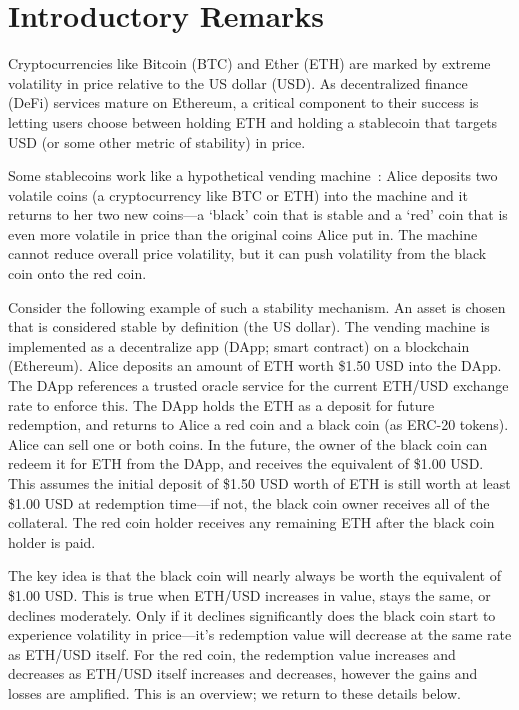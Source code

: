 

\section{Introductory Remarks}

Cryptocurrencies like Bitcoin (BTC) and Ether (ETH) are marked by extreme volatility in price relative to the US dollar (USD). As decentralized finance (DeFi) services mature on Ethereum, a critical component to their success is letting users choose between holding ETH and holding a stablecoin that targets USD (or some other metric of stability) in price.

Some stablecoins work like a hypothetical vending machine~\cite{CDM20}: Alice deposits two volatile coins (\eg a cryptocurrency like BTC or ETH) into the machine and it returns to her two new coins---a `black' coin that is stable and a `red' coin that is even more volatile in price than the original coins Alice put in. The machine cannot reduce overall price volatility, but it can push volatility from the black coin onto the red coin. 

Consider the following example of such a stability mechanism. An asset is chosen that is considered stable by definition (\eg the US dollar). The vending machine is implemented as a decentralize app (DApp; \aka smart contract) on a blockchain (\eg Ethereum). Alice deposits an amount of ETH worth \$1.50 USD into the DApp. The DApp references a trusted oracle service for the current ETH/USD exchange rate to enforce this. The DApp holds the ETH as a deposit for future redemption, and returns to Alice a red coin and a black coin (\eg as ERC-20 tokens). Alice can sell one or both coins. In the future, the owner of the black coin can redeem it for ETH from the DApp, and receives the equivalent of \$1.00 USD. This assumes the initial deposit of \$1.50 USD worth of ETH is still worth at least \$1.00 USD at redemption time---if not, the black coin owner receives all of the collateral. The red coin holder receives any remaining ETH after the black coin holder is paid.

The key idea is that the black coin will nearly always be worth the equivalent of \$1.00 USD. This is true when ETH/USD increases in value, stays the same, or declines moderately. Only if it declines significantly does the black coin start to experience volatility in price---it's redemption value will decrease at the same rate as ETH/USD itself. For the red coin, the redemption value increases and decreases as ETH/USD itself increases and decreases, however the gains and losses are amplified. This is an overview; we return to these details below.

